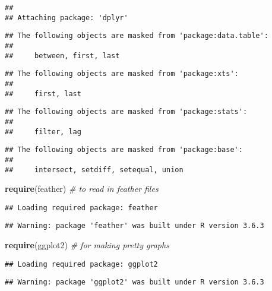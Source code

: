 \documentclass[
]{article}
\newenvironment{Shaded}{\begin{snugshade}}{\end{snugshade}}
\newcommand{\CommentTok}[1]{\textcolor[rgb]{0.56,0.35,0.01}{\textit{#1}}}
\newcommand{\KeywordTok}[1]{\textcolor[rgb]{0.13,0.29,0.53}{\textbf{#1}}}
\newcommand{\NormalTok}[1]{#1}
\begin{document}
\begin{verbatim}
## 
## Attaching package: 'dplyr'
\end{verbatim}

\begin{verbatim}
## The following objects are masked from 'package:data.table':
## 
##     between, first, last
\end{verbatim}

\begin{verbatim}
## The following objects are masked from 'package:xts':
## 
##     first, last
\end{verbatim}

\begin{verbatim}
## The following objects are masked from 'package:stats':
## 
##     filter, lag
\end{verbatim}

\begin{verbatim}
## The following objects are masked from 'package:base':
## 
##     intersect, setdiff, setequal, union
\end{verbatim}

\begin{Shaded}
\begin{Highlighting}[]
\KeywordTok{require}\NormalTok{(feather) }\CommentTok{# to read in feather files}
\end{Highlighting}
\end{Shaded}

\begin{verbatim}
## Loading required package: feather
\end{verbatim}

\begin{verbatim}
## Warning: package 'feather' was built under R version 3.6.3
\end{verbatim}

\begin{Shaded}
\begin{Highlighting}[]
\KeywordTok{require}\NormalTok{(ggplot2) }\CommentTok{# for making pretty graphs}
\end{Highlighting}
\end{Shaded}

\begin{verbatim}
## Loading required package: ggplot2
\end{verbatim}

\begin{verbatim}
## Warning: package 'ggplot2' was built under R version 3.6.3
\end{verbatim}
\end{document}
